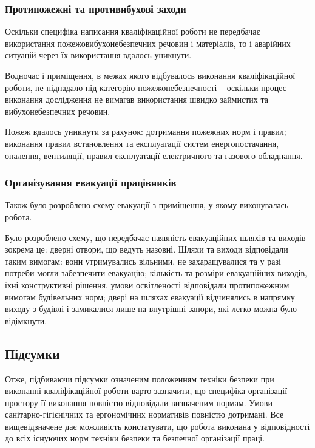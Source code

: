 \subsubsection{Протипожежні та противибухові заходи}

Оскільки специфіка написання кваліфікаційної роботи не передбачає використання пожежовибухонебезпечних речовин і матеріалів, то і аварійних ситуацій через їх використання вдалось уникнути.

Водночас і приміщення, в межах якого відбувалось виконання кваліфікаційної роботи, не підпадало під категорію пожежонебезпечності – оскільки процес виконання дослідження не вимагав використання швидко займистих та вибухонебезпечних речовин.

Пожеж вдалось уникнути за рахунок: дотримання пожежних норм і правил; виконання правил встановлення та експлуатації систем енергопостачання, опалення, вентиляції, правил експлуатації електричного та газового обладнання.


\subsubsection{Організування евакуації працівників}

Також було розроблено схему евакуації з приміщення, у якому виконувалась робота.

Було розроблено схему, що передбачає наявність евакуаційних шляхів та виходів зокрема це: дверні отвори, що ведуть назовні.
Шляхи та виходи відповідали таким вимогам: вони утримувались вільними, не захаращувалися та у разі потреби могли забезпечити евакуацію; кількість та розміри евакуаційних виходів, їхні конструктивні рішення, умови освітленості відповідали протипожежним вимогам будівельних норм; двері на шляхах евакуації відчинялись в напрямку виходу з будівлі і замикалися лише на внутрішні запори, які легко можна було відімкнути.

\subsection{Підсумки}
Отже, підбиваючи підсумки означеним положенням техніки безпеки при виконанні кваліфікаційної роботи варто зазначити, що специфіка організації простору її виконання повністю відповідали визначеним нормам. Умови санітарно-гігієнічних та ергономічних нормативів повністю дотримані. Все вищевідзначене дає можливість констатувати, що робота виконана у відповідності до всіх існуючих норм техніки безпеки та безпечної організації праці.

